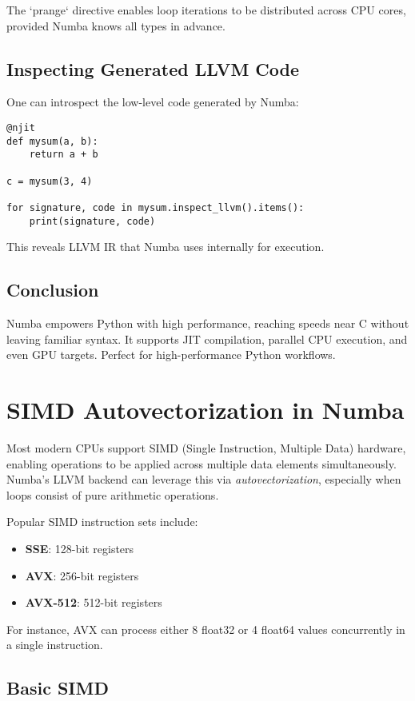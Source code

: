 \documentclass[11pt,a4paper]{book}
\begin{document}
The `prange` directive enables loop iterations to be distributed across CPU cores, provided Numba knows all types in advance.

\section{Inspecting Generated LLVM Code}
One can introspect the low-level code generated by Numba:

\begin{lstlisting}
@njit
def mysum(a, b):
    return a + b

c = mysum(3, 4)

for signature, code in mysum.inspect_llvm().items():
    print(signature, code)
\end{lstlisting}

This reveals LLVM IR that Numba uses internally for execution.

\section*{Conclusion}
Numba empowers Python with high performance, reaching speeds near C without leaving familiar syntax. It supports JIT compilation, parallel CPU execution, and even GPU targets. Perfect for high-performance Python workflows.

\pagebreak

\chapter{SIMD Autovectorization in Numba}

Most modern CPUs support SIMD (Single Instruction, Multiple Data) hardware, enabling operations to be applied across multiple data elements simultaneously. Numba’s LLVM backend can leverage this via \emph{autovectorization}, especially when loops consist of pure arithmetic operations.

Popular SIMD instruction sets include:
\begin{itemize}
  \item \textbf{SSE}: 128-bit registers
  \item \textbf{AVX}: 256-bit registers
  \item \textbf{AVX-512}: 512-bit registers
\end{itemize}
For instance, AVX can process either 8 float32 or 4 float64 values concurrently in a single instruction.

\section{Basic SIMD}
\end{document}
